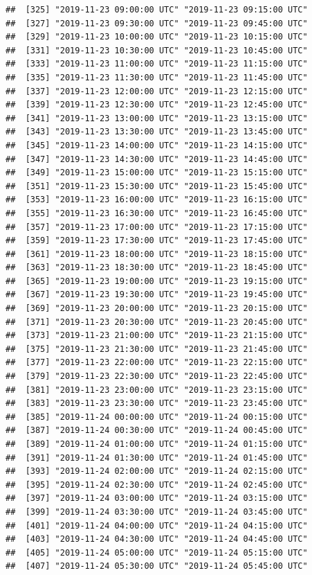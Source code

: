 \documentclass{article}\usepackage[]{graphicx}\usepackage[]{color}
\makeatletter
\newenvironment{kframe}{%
 \def\at@end@of@kframe{}%
 \ifinner\ifhmode%
  \def\at@end@of@kframe{\end{minipage}}%
  \begin{minipage}{\columnwidth}%
 \fi\fi%
 \def\FrameCommand##1{\hskip\@totalleftmargin \hskip-\fboxsep
 \colorbox{shadecolor}{##1}\hskip-\fboxsep
     \hskip-\linewidth \hskip-\@totalleftmargin \hskip\columnwidth}%
 \MakeFramed {\advance\hsize-\width
   \@totalleftmargin\z@ \linewidth\hsize
   \@setminipage}}%
 {\par\unskip\endMakeFramed%
 \at@end@of@kframe}
\newenvironment{knitrout}{}{} %
\makeatother
\begin{document}
\begin{knitrout}
\begin{kframe}
\begin{verbatim}
##  [325] "2019-11-23 09:00:00 UTC" "2019-11-23 09:15:00 UTC"
##  [327] "2019-11-23 09:30:00 UTC" "2019-11-23 09:45:00 UTC"
##  [329] "2019-11-23 10:00:00 UTC" "2019-11-23 10:15:00 UTC"
##  [331] "2019-11-23 10:30:00 UTC" "2019-11-23 10:45:00 UTC"
##  [333] "2019-11-23 11:00:00 UTC" "2019-11-23 11:15:00 UTC"
##  [335] "2019-11-23 11:30:00 UTC" "2019-11-23 11:45:00 UTC"
##  [337] "2019-11-23 12:00:00 UTC" "2019-11-23 12:15:00 UTC"
##  [339] "2019-11-23 12:30:00 UTC" "2019-11-23 12:45:00 UTC"
##  [341] "2019-11-23 13:00:00 UTC" "2019-11-23 13:15:00 UTC"
##  [343] "2019-11-23 13:30:00 UTC" "2019-11-23 13:45:00 UTC"
##  [345] "2019-11-23 14:00:00 UTC" "2019-11-23 14:15:00 UTC"
##  [347] "2019-11-23 14:30:00 UTC" "2019-11-23 14:45:00 UTC"
##  [349] "2019-11-23 15:00:00 UTC" "2019-11-23 15:15:00 UTC"
##  [351] "2019-11-23 15:30:00 UTC" "2019-11-23 15:45:00 UTC"
##  [353] "2019-11-23 16:00:00 UTC" "2019-11-23 16:15:00 UTC"
##  [355] "2019-11-23 16:30:00 UTC" "2019-11-23 16:45:00 UTC"
##  [357] "2019-11-23 17:00:00 UTC" "2019-11-23 17:15:00 UTC"
##  [359] "2019-11-23 17:30:00 UTC" "2019-11-23 17:45:00 UTC"
##  [361] "2019-11-23 18:00:00 UTC" "2019-11-23 18:15:00 UTC"
##  [363] "2019-11-23 18:30:00 UTC" "2019-11-23 18:45:00 UTC"
##  [365] "2019-11-23 19:00:00 UTC" "2019-11-23 19:15:00 UTC"
##  [367] "2019-11-23 19:30:00 UTC" "2019-11-23 19:45:00 UTC"
##  [369] "2019-11-23 20:00:00 UTC" "2019-11-23 20:15:00 UTC"
##  [371] "2019-11-23 20:30:00 UTC" "2019-11-23 20:45:00 UTC"
##  [373] "2019-11-23 21:00:00 UTC" "2019-11-23 21:15:00 UTC"
##  [375] "2019-11-23 21:30:00 UTC" "2019-11-23 21:45:00 UTC"
##  [377] "2019-11-23 22:00:00 UTC" "2019-11-23 22:15:00 UTC"
##  [379] "2019-11-23 22:30:00 UTC" "2019-11-23 22:45:00 UTC"
##  [381] "2019-11-23 23:00:00 UTC" "2019-11-23 23:15:00 UTC"
##  [383] "2019-11-23 23:30:00 UTC" "2019-11-23 23:45:00 UTC"
##  [385] "2019-11-24 00:00:00 UTC" "2019-11-24 00:15:00 UTC"
##  [387] "2019-11-24 00:30:00 UTC" "2019-11-24 00:45:00 UTC"
##  [389] "2019-11-24 01:00:00 UTC" "2019-11-24 01:15:00 UTC"
##  [391] "2019-11-24 01:30:00 UTC" "2019-11-24 01:45:00 UTC"
##  [393] "2019-11-24 02:00:00 UTC" "2019-11-24 02:15:00 UTC"
##  [395] "2019-11-24 02:30:00 UTC" "2019-11-24 02:45:00 UTC"
##  [397] "2019-11-24 03:00:00 UTC" "2019-11-24 03:15:00 UTC"
##  [399] "2019-11-24 03:30:00 UTC" "2019-11-24 03:45:00 UTC"
##  [401] "2019-11-24 04:00:00 UTC" "2019-11-24 04:15:00 UTC"
##  [403] "2019-11-24 04:30:00 UTC" "2019-11-24 04:45:00 UTC"
##  [405] "2019-11-24 05:00:00 UTC" "2019-11-24 05:15:00 UTC"
##  [407] "2019-11-24 05:30:00 UTC" "2019-11-24 05:45:00 UTC"

\end{verbatim}
\end{kframe}
\end{knitrout}
\end{document}

